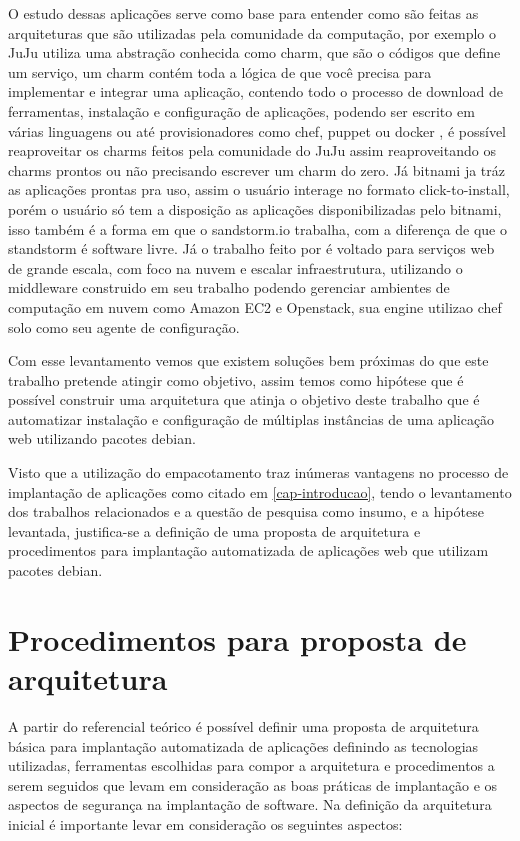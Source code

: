 O estudo dessas aplicações serve como base para entender como são feitas as
arquiteturas que são utilizadas pela comunidade da computação, por exemplo o JuJu
utiliza uma abstração conhecida como charm, que são o códigos que define um serviço,
um charm contém toda a lógica de que você precisa para implementar e integrar uma
aplicação, contendo todo o processo de download de ferramentas, instalação e configuração
de aplicações, podendo ser escrito
em várias linguagens ou até provisionadores como chef, puppet ou docker \cite{juju}, é
possível reaproveitar os charms feitos pela comunidade do JuJu assim reaproveitando
os charms prontos ou não precisando escrever um charm do zero. Já bitnami ja tráz as aplicações
prontas pra uso, assim o usuário interage no formato click-to-install, porém o usuário
só tem a disposição as aplicações disponibilizadas pelo bitnami, isso também é
a forma em que o sandstorm.io trabalha, com a diferença de que o standstorm é
software livre. Já o trabalho feito por \cite{leo2014} é voltado para serviços web
de grande escala, com foco na nuvem e escalar infraestrutura, utilizando o middleware
construido em seu trabalho podendo gerenciar ambientes de computação em nuvem
como Amazon EC2 e Openstack, sua engine utilizao chef solo como seu agente de configuração.

Com esse levantamento vemos que existem soluções bem próximas do que este trabalho
pretende atingir como objetivo, assim temos como hipótese que é possível construir
uma arquitetura que atinja o objetivo deste trabalho que é automatizar instalação e configuração de
múltiplas instâncias de uma aplicação web utilizando pacotes debian.

Visto que a utilização do empacotamento traz inúmeras vantagens no processo de implantação
de aplicações como citado em \ref{cap-introducao}, tendo o levantamento dos trabalhos relacionados
e a questão de pesquisa como insumo, e a hipótese levantada, justifica-se a
definição de uma proposta de arquitetura e procedimentos para implantação automatizada
de aplicações web que utilizam pacotes debian.

\section{Procedimentos para proposta de arquitetura}

A partir do referencial teórico é possível definir uma proposta de
arquitetura básica para implantação automatizada de aplicações definindo as
tecnologias utilizadas, ferramentas escolhidas para compor a arquitetura e procedimentos
a serem seguidos que levam em consideração as boas práticas de implantação e os
aspectos de segurança na implantação de software. Na definição da arquitetura inicial
é importante levar em consideração os seguintes aspectos:

